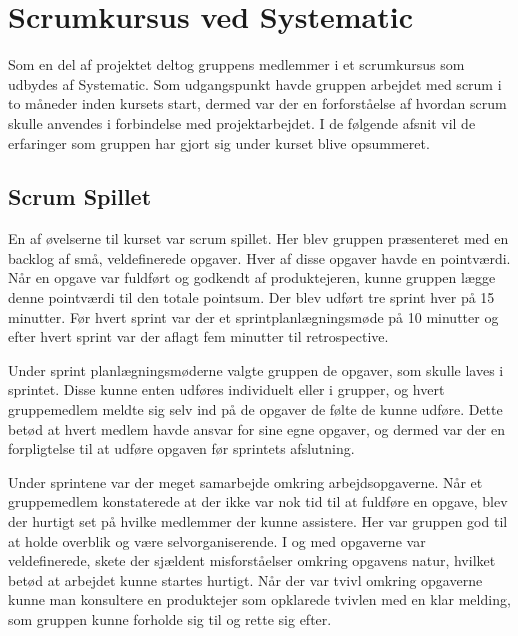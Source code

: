 \chapter{Scrumkursus ved Systematic}
Som en del af projektet deltog gruppens medlemmer i et scrumkursus som udbydes af Systematic. Som udgangspunkt havde gruppen arbejdet med scrum i to måneder inden kursets start, dermed var der en forforståelse af hvordan scrum skulle anvendes i forbindelse med projektarbejdet. I de følgende afsnit vil de erfaringer som gruppen har gjort sig under kurset blive opsummeret.

\section{Scrum Spillet}
En af øvelserne til kurset var scrum spillet. Her blev gruppen præsenteret med en backlog af små, veldefinerede opgaver. Hver af disse opgaver havde en pointværdi. Når en opgave var fuldført og godkendt af produktejeren, kunne gruppen lægge denne pointværdi til den totale pointsum. Der blev udført tre sprint hver på 15 minutter. Før hvert sprint var der et sprintplanlægningsmøde på 10 minutter og efter hvert sprint var der aflagt fem minutter til retrospective. \newline

\noindent Under sprint planlægningsmøderne valgte gruppen de opgaver, som skulle laves i sprintet. Disse kunne enten udføres individuelt eller i grupper, og hvert gruppemedlem meldte sig selv ind på de opgaver de følte de kunne udføre. Dette betød at hvert medlem havde ansvar for sine egne opgaver, og dermed var der en forpligtelse til at udføre opgaven før sprintets afslutning. \newline

\noindent Under sprintene var der meget samarbejde omkring arbejdsopgaverne. Når et gruppemedlem konstaterede at der ikke var nok tid til at fuldføre en opgave, blev der hurtigt set på hvilke medlemmer der kunne assistere. Her var gruppen god til at holde overblik og være selvorganiserende. I og med opgaverne var veldefinerede, skete der sjældent misforståelser omkring opgavens natur, hvilket betød at arbejdet kunne startes hurtigt. Når der var tvivl omkring opgaverne kunne man konsultere en produktejer som opklarede tvivlen med en klar melding, som gruppen kunne forholde sig til og rette sig efter.  \newline

